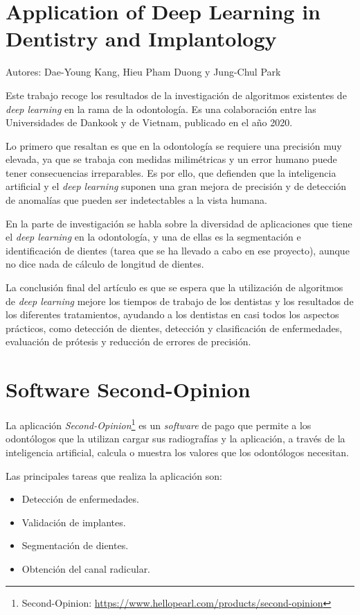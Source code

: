 
\section{Application of Deep Learning in Dentistry and
Implantology}
Autores: Dae-Young Kang, Hieu Pham Duong y Jung-Chul Park

Este trabajo \cite{kang2020application} recoge los resultados de la investigación de algoritmos existentes de \emph{deep learning} en la rama de la odontología. Es una colaboración entre las Universidades de Dankook y de Vietnam, publicado en el año 2020.

Lo primero que resaltan es que en la odontología se requiere una precisión muy elevada, ya que se trabaja con medidas milimétricas y un error humano puede tener consecuencias irreparables. Es por ello, que defienden que la inteligencia artificial y el \emph{deep learning} suponen una gran mejora de precisión y de detección de anomalías que pueden ser indetectables a la vista humana.

En la parte de investigación se habla sobre la diversidad de aplicaciones que tiene el \emph{deep learning} en la odontología, y una de ellas es la segmentación e identificación de dientes (tarea que se ha llevado a cabo en ese proyecto), aunque no dice nada de cálculo de longitud de dientes.

La conclusión final del artículo es que se espera que la utilización de algoritmos de \emph{deep learning} mejore los tiempos de trabajo de los dentistas y los resultados de los diferentes tratamientos, ayudando a los dentistas en casi todos los aspectos prácticos, como detección de dientes, detección y clasificación de enfermedades, evaluación de prótesis y reducción de errores de precisión.

\section{Software Second-Opinion}
La aplicación \emph{Second-Opinion}\footnote{Second-Opinion: \url{https://www.hellopearl.com/products/second-opinion}} es un \emph{software} de pago que permite a los odontólogos que la utilizan cargar sus radiografías y la aplicación, a través de la inteligencia artificial, calcula o muestra los valores que los odontólogos necesitan.

Las principales tareas que realiza la aplicación son:
\begin{itemize}
    \item Detección de enfermedades.
    \item Validación de implantes.
    \item Segmentación de dientes.
    \item Obtención del canal radicular.
\end{itemize}

